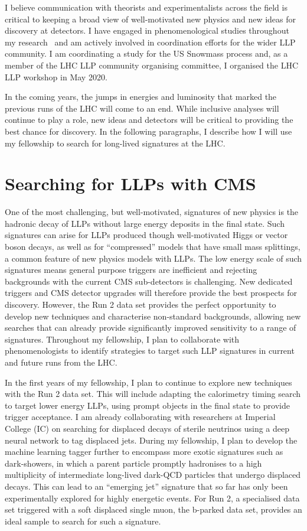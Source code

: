\documentclass[11pt,a4paper]{article}
\theoremstyle{plain} \numberwithin{equation}{section}
\theoremstyle{definition}
\newcounter{list}
\begin{document}
I believe communication with theorists and experimentalists
across the field is critical to keeping a broad view of well-motivated
new physics and new ideas for discovery at detectors. I have engaged
in phenomenological studies throughout my research~\cite{deVries:2015hva,Citron:2012fg} 
and am actively involved in coordination efforts for the wider LLP community.
I am coordinating a study for the US Snowmass process and, 
as a member of the LHC LLP community organising committee, I
organised the LHC LLP workshop in May 2020.

In the coming years, the jumps in energies and luminosity that marked the previous runs of the 
LHC will come to an end. While inclusive analyses will continue to play a role, 
new ideas and detectors will be critical to 
providing the best chance for discovery. In the following paragraphs, I describe
how I will use my fellowship to search for long-lived signatures at the LHC.

\section*{Searching for LLPs with CMS}

One of the most challenging, but well-motivated, signatures
of new physics is the hadronic decay of LLPs without large
energy deposits in the final state. Such signatures can 
arise for LLPs produced though
well-motivated Higgs or vector boson decays, as well as for ``compressed'' models 
that have small mass splittings, a common 
feature of new physics models with LLPs.
The low energy scale of such signatures means general purpose triggers
are inefficient and rejecting backgrounds with the current CMS sub-detectors 
is challenging. New dedicated triggers and CMS detector upgrades will 
therefore provide the best prospects
for discovery. However, the Run 2 data set provides
the perfect opportunity to develop new techniques 
and characterise non-standard backgrounds, allowing new searches
that can already provide significantly improved sensitivity to a range
of signatures. Throughout my fellowship, I plan to collaborate with
phenomenologists to identify strategies to target such LLP signatures in current
and future runs from the LHC.
    
In the first years of my fellowship, I plan to continue to
explore new techniques with the Run 2 data set. This will include 
adapting the calorimetry timing search
to target lower energy LLPs, using prompt objects
in the final state to provide trigger acceptance. I am already collaborating with 
researchers at Imperial College (IC) on 
searching for displaced decays of sterile neutrinos
using a deep neural network to tag displaced jets. During my fellowship, I plan to develop
the machine learning tagger further to encompass more exotic signatures such as dark-showers, in
which a parent particle promptly hadronises to a high 
multiplicity of intermediate long-lived dark-QCD particles that undergo displaced decays. 
This can lead to an ``emerging jet'' signature that so far has only
been experimentally explored for highly energetic events. For Run 2, a specialised data set triggered
with a soft displaced single muon, the b-parked data set, provides an ideal sample to search for
such a signature.
\end{document}
